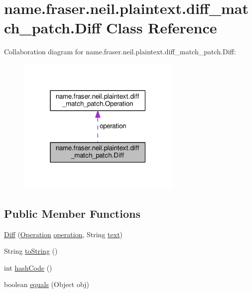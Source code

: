 \hypertarget{classname_1_1fraser_1_1neil_1_1plaintext_1_1diff__match__patch_1_1Diff}{}\section{name.\+fraser.\+neil.\+plaintext.\+diff\+\_\+match\+\_\+patch.\+Diff Class Reference}
\label{classname_1_1fraser_1_1neil_1_1plaintext_1_1diff__match__patch_1_1Diff}


Collaboration diagram for name.\+fraser.\+neil.\+plaintext.\+diff\+\_\+match\+\_\+patch.\+Diff\+:
\nopagebreak
\begin{figure}[H]
\begin{center}
\leavevmode
\includegraphics[width=223pt]{classname_1_1fraser_1_1neil_1_1plaintext_1_1diff__match__patch_1_1Diff__coll__graph}
\end{center}
\end{figure}
\subsection*{Public Member Functions}
\begin{DoxyCompactItemize}
\item 
\hyperlink{classname_1_1fraser_1_1neil_1_1plaintext_1_1diff__match__patch_1_1Diff_a770a02f25c2723f194c3cd5cfe015372}{Diff} (\hyperlink{enumname_1_1fraser_1_1neil_1_1plaintext_1_1diff__match__patch_1_1Operation}{Operation} \hyperlink{classname_1_1fraser_1_1neil_1_1plaintext_1_1diff__match__patch_1_1Diff_a4a08d50147ba19eeaa7a4e511e7490db}{operation}, String \hyperlink{classname_1_1fraser_1_1neil_1_1plaintext_1_1diff__match__patch_1_1Diff_a1cc57ba795b3f2ed1ba92a103d16759e}{text})
\item 
String \hyperlink{classname_1_1fraser_1_1neil_1_1plaintext_1_1diff__match__patch_1_1Diff_a83dc8996325e110ed8b01ddeb041c526}{to\+String} ()
\item 
int \hyperlink{classname_1_1fraser_1_1neil_1_1plaintext_1_1diff__match__patch_1_1Diff_a7aa6ffcd9717ccbb8045fe8babc0f941}{hash\+Code} ()
\item 
boolean \hyperlink{classname_1_1fraser_1_1neil_1_1plaintext_1_1diff__match__patch_1_1Diff_ac39b7de6f9026a5ad32fc41de5453df8}{equals} (Object obj)
\end{DoxyCompactItemize}
